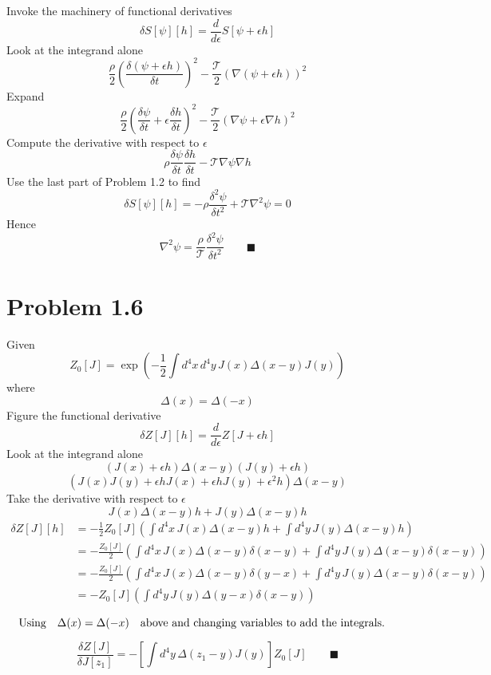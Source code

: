 \documentclass{amsart}
\begin{document}
Invoke the machinery of functional derivatives
\[\delta S[\psi][h]=\frac{d}{d\epsilon}S[\psi+\epsilon h]\]
Look at the integrand alone
\[\frac{\rho}{2}\left(\frac{\delta (\psi+\epsilon h)}{\delta t}\right)^2 - \frac{\mathcal{T}}{2}\left(\nabla(\psi+\epsilon h)\right)^2\]
Expand
\[\frac{\rho}{2}\left(\frac{\delta \psi}{\delta t}+\epsilon \frac{\delta h}{\delta t}\right)^2 - \frac{\mathcal{T}}{2}\left(\nabla \psi+\epsilon \nabla h\right)^2\]
Compute the derivative with respect to $\epsilon$
\[\rho\frac{\delta \psi}{\delta t}\frac{\delta h}{\delta t} - \mathcal{T}\nabla \psi \nabla h\]
Use the last part of Problem 1.2 to find
\[\delta S[\psi][h]=-\rho\frac{\delta^2 \psi}{\delta t^2} + \mathcal{T}\nabla^2 \psi =0\]
Hence
\[\nabla^2 \psi=\frac{\rho}{\mathcal{T}}\frac{\delta^2 \psi}{\delta t^2} \qquad \blacksquare\]

\section*{Problem 1.6}
Given \[Z_0[J]=\exp\left(-\frac{1}{2}\int d^4 x\, d^4 y\, J(x) \Delta(x-y) J(y)\right)\]
where \[\Delta(x)=\Delta(-x)\]
Figure the functional derivative
\[\delta Z[J][h]=\frac{d}{d\epsilon}Z[J+\epsilon h]\]
Look at the integrand alone
\[(J(x)+\epsilon h) \Delta(x-y) (J(y)+\epsilon h)\]
\[(J(x)J(y)+\epsilon h J(x)+\epsilon h J(y)+\epsilon^2 h) \Delta(x-y)\]
Take the derivative with respect to $\epsilon$
\[J(x) \Delta(x-y)h + J(y) \Delta(x-y)h\]
\begin{align*}
\delta Z[J][h]&=-\frac{1}{2}Z_0[J]\left(\int d^4 x\,  J(x) \Delta(x-y)h +\int d^4 y\,J(y) \Delta(x-y)h\right)\\
&=-\frac{Z_0[J]}{2}\left(\int d^4 x\,  J(x) \Delta(x-y)\delta(x-y) +\int d^4 y\,J(y) \Delta(x-y)\delta(x-y)\right)\\
&=-\frac{Z_0[J]}{2}\left(\int d^4 x\,  J(x) \Delta(x-y)\delta(y-x) +\int d^4 y\,J(y) \Delta(x-y)\delta(x-y)\right)\\ 
&=-Z_0[J]\left(\int d^4 y\,J(y) \Delta(y-x)\delta(x-y)\right)\\
\end{align*}
\[\qq*{Using}\Delta(x)=\Delta(-x)\qq{above and changing variables to add the integrals.}\]

\[\frac{\delta Z[J]}{\delta J[z_1]}=-\left[\int d^4 y\, \Delta(z_1-y)J(y)\right]Z_0[J] \qquad \blacksquare\]
\end{document}
